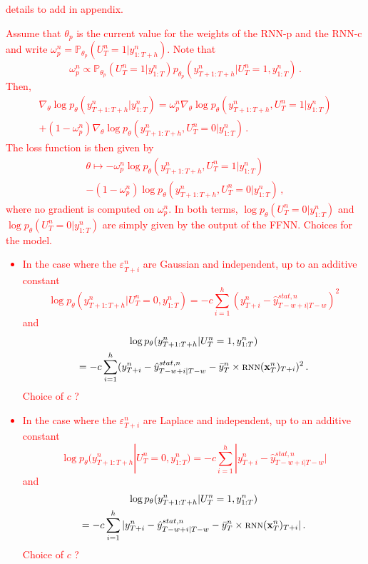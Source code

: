 \documentclass{article} %
\newcommand{\ts}{y}
\newcommand{\tspred}{\hat{\ts}}
\newcommand{\meants}{\Bar{\ts}}
\newcommand{\rnnmodel}{\textsc{rnn}}
\newcommand{\concatinput}{x}
\newcommand{\fullconcatinput}{{ \bf \concatinput}}
\begin{document}




\section{}




\textcolor{red}{details to add in appendix.} \textcolor{red}{Assume that $\theta_p$ is the current value for the weights of the RNN-p and the RNN-c and write $\omega_p^n = \mathbb{P}_{\theta_p}(U_T^n = 1|\ts^n_{1:T+h})$. Note that
$$
\omega_p^n \propto \mathbb{P}_{\theta_p}(U_T^n = 1|\ts^n_{1:T})p_{\theta_p}(\ts^n_{T+1:T+h}|U_T^n=1,\ts^n_{1:T})\,.
$$
Then,
\begin{multline*}
\nabla_\theta \log p_\theta(\ts^n_{T+1:T+h}|\ts^n_{1:T}) = \omega_p^n\nabla_\theta \log p_\theta(\ts^n_{T+1:T+h},U_T^n=1|\ts^n_{1:T})\\
+ (1-\omega_p^n)\nabla_\theta \log p_\theta(\ts^n_{T+1:T+h},U_T^n=0|\ts^n_{1:T})\,.
\end{multline*}
The loss function is then given by
\begin{multline*}
\theta\mapsto - \omega_p^n \log p_\theta(\ts^n_{T+1:T+h},U_T^n=1|\ts^n_{1:T})\\
- (1-\omega_p^n) \log p_\theta(\ts^n_{T+1:T+h},U_T^n=0|\ts^n_{1:T})\,,
\end{multline*} 
where no gradient is computed on $\omega_p^n$. In both terms, $\log p_\theta(U_T^n=0|\ts^n_{1:T})$ and $\log p_\theta(U_T^n=0|\ts^n_{1:T})$ are simply given by the output of the FFNN.  Choices for the model.
\begin{itemize}
\item In the case where the  $\varepsilon^n_{T+i}$ are Gaussian and independent, up to an additive constant
$$
\log p_\theta(\ts^n_{T+1:T+h}|U_T^n=0,\ts^n_{1:T}) = -c\sum_{i=1}^{h}(\ts^n_{T+i}  - \tspred^{stat,n}_{T-w+i|T-w})^2
$$
and
\begin{multline*}
\log p_\theta(\ts^n_{T+1:T+h}|U_T^n=1,\ts^n_{1:T})\\
 = -c\sum_{i=1}^{h}(\ts^n_{T+i}  - \tspred^{stat,n}_{T-w+i|T-w} - \meants^n_T\times \rnnmodel(\fullconcatinput^n_T)_{T+i})^2\,.
\end{multline*}
Choice of $c$ ?
\item In the case where the  $\varepsilon^n_{T+i}$ are Laplace and independent, up to an additive constant
$$
\log p_\theta(\ts^n_{T+1:T+h}|U_T^n=0,\ts^n_{1:T}) = -c\sum_{i=1}^{h}|\ts^n_{T+i}  - \tspred^{stat,n}_{T-w+i|T-w}|
$$
and
\begin{multline*}
\log p_\theta(\ts^n_{T+1:T+h}|U_T^n=1,\ts^n_{1:T})\\
 = -c\sum_{i=1}^{h}|\ts^n_{T+i}  - \tspred^{stat,n}_{T-w+i|T-w} - \meants^n_T\times \rnnmodel(\fullconcatinput^n_T)_{T+i}|\,.
\end{multline*}
Choice of $c$ ?
\end{itemize}}
\end{document}
